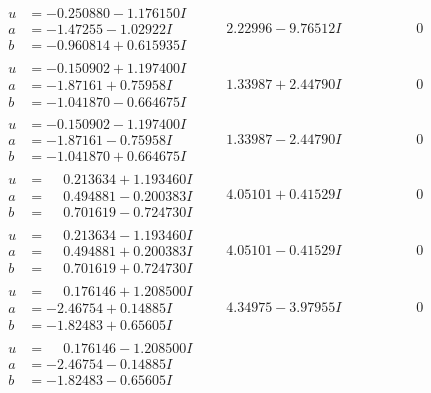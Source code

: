 \documentclass[1p]{elsarticle_modified}
\theoremstyle{definition}
\begin{document}
$$\begin{array}{c|c|c}
\begin{aligned}
u &= -0.250880 - 1.176150 I \\
a &= -1.47255 - 1.02922 I \\
b &= -0.960814 + 0.615935 I\end{aligned}
 & \phantom{-}2.22996 - 9.76512 I & \phantom{-0.000000 } 0 \\ \hline\begin{aligned}
u &= -0.150902 + 1.197400 I \\
a &= -1.87161 + 0.75958 I \\
b &= -1.041870 - 0.664675 I\end{aligned}
 & \phantom{-}1.33987 + 2.44790 I & \phantom{-0.000000 } 0 \\ \hline\begin{aligned}
u &= -0.150902 - 1.197400 I \\
a &= -1.87161 - 0.75958 I \\
b &= -1.041870 + 0.664675 I\end{aligned}
 & \phantom{-}1.33987 - 2.44790 I & \phantom{-0.000000 } 0 \\ \hline\begin{aligned}
u &= \phantom{-}0.213634 + 1.193460 I \\
a &= \phantom{-}0.494881 - 0.200383 I \\
b &= \phantom{-}0.701619 - 0.724730 I\end{aligned}
 & \phantom{-}4.05101 + 0.41529 I & \phantom{-0.000000 } 0 \\ \hline\begin{aligned}
u &= \phantom{-}0.213634 - 1.193460 I \\
a &= \phantom{-}0.494881 + 0.200383 I \\
b &= \phantom{-}0.701619 + 0.724730 I\end{aligned}
 & \phantom{-}4.05101 - 0.41529 I & \phantom{-0.000000 } 0 \\ \hline\begin{aligned}
u &= \phantom{-}0.176146 + 1.208500 I \\
a &= -2.46754 + 0.14885 I \\
b &= -1.82483 + 0.65605 I\end{aligned}
 & \phantom{-}4.34975 - 3.97955 I & \phantom{-0.000000 } 0 \\ \hline\begin{aligned}
u &= \phantom{-}0.176146 - 1.208500 I \\
a &= -2.46754 - 0.14885 I \\
b &= -1.82483 - 0.65605 I\end{aligned}

\end{array}$$
\end{document}
